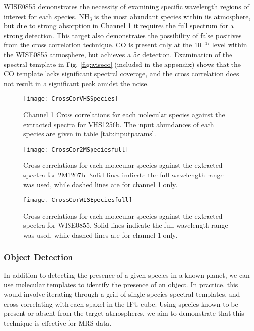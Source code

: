 WISE0855 demonstrates the necessity of examining specific wavelength regions of interest for each species.
NH$_{3}$ is the most abundant species within its atmosphere, but due to strong absorption in Channel 1 it requires the full spectrum for a strong detection.
This target also demonstrates the possibility of false positives from the cross correlation technique.
CO is present only at the 10$^{-15}$ level within the WISE0855 atmosphere, but achieves a 5$\sigma$ detection. 
Examination of the spectral template in Fig. \ref{fig:wiseco} (included in the appendix) shows that the CO template lacks significant spectral coverage, and the cross correlation does not result in a significant peak amidst the noise.
\begin{figure}[t]
	\texttt{[image: CrossCorVHSSpecies]}
	\caption{Channel 1 Cross correlations for each molecular species against the extracted spectra for VHS1256b. The input abundances of each species are given in table \ref{tab:inputparams}. }
	\label{fig:ccspecvhs}
\end{figure}
\begin{figure}[h]
	\texttt{[image: CrossCor2MSpeciesfull]}
	\caption{Cross correlations for each molecular species against the extracted spectra for 2M1207b. Solid lines indicate the full wavelength range was used, while dashed lines are for channel 1 only.}
	\label{fig:ccspec2mfull}
\end{figure}
\begin{figure}[h]
	\texttt{[image: CrossCorWISEpeciesfull]}
	\caption{Cross correlations for each molecular species against the extracted spectra for WISE0855. Solid lines indicate the full wavelength range was used, while dashed lines are for channel 1 only.}
	\label{fig:ccspecwisefull}
\end{figure}
\subsubsection{Object Detection}
In addition to detecting the presence of a given species in a known planet, we can use molecular templates to identify the presence of an object.
In practice, this would involve iterating through a grid of single species spectral templates, and cross correlating with each spaxel in the IFU cube.
Using species known to be present or absent from the target atmospheres, we aim to demonstrate that this technique is effective for MRS data.

